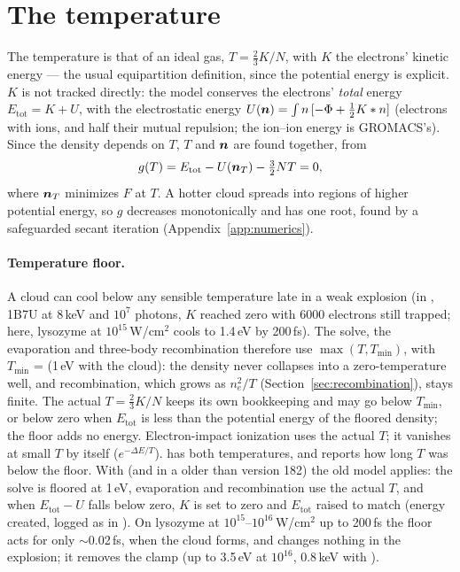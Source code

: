 \section{The temperature}
\label{sec:temperature}

The temperature is that of an ideal gas, $T = \frac23K/N$, with $K$ the electrons' kinetic energy --- the usual
equipartition definition, since the potential energy is explicit.
$K$ is not tracked directly: the model conserves the electrons' \emph{total} energy $E_{\mathrm{tot}} = K + U$, with
the electrostatic energy $U(\bm{n}) = \int n\,[-\Phi + \frac12K*n]$ (electrons with ions, and half their mutual
repulsion; the ion--ion energy is GROMACS's).
Since the density depends on $T$, $T$ and $\bm{n}$ are found together, from
\begin{equation}
  g(T) = E_{\mathrm{tot}} - U(\bm{n}_T) - \tfrac32NT = 0,
\end{equation}
where $\bm{n}_T$ minimizes $F$ at $T$.
A hotter cloud spreads into regions of higher potential energy, so $g$ decreases monotonically and has one root,
found by a safeguarded secant iteration (Appendix~\ref{app:numerics}).

\paragraph{Temperature floor.}
A cloud can cool below any sensible temperature late in a weak explosion (in , 1B7U at 8\,keV and
$10^7$ photons, $K$ reached zero with 6000 electrons still trapped; here, lysozyme at $10^{15}$\,W/cm$^2$ cools to
1.4\,eV by 200\,fs).
The solve, the evaporation and three-body recombination therefore use $\max(T, T_{\min})$, with $T_{\min}$ =
 (1\,eV with the cloud): the density never collapses into a zero-temperature well, and recombination, which grows as
$n_e^2/T$ (Section~\ref{sec:recombination}), stays finite.
The actual $T = \frac23K/N$ keeps its own bookkeeping and may go below $T_{\min}$, or below zero when
$E_{\mathrm{tot}}$ is less than the potential energy of the floored density; the floor adds no energy.
Electron-impact ionization uses the actual $T$; it vanishes at small $T$ by itself ($e^{-\Delta E/T}$).
 has both temperatures, and  reports how long $T$ was below the floor.
With  (and in a  older than version 182) the old model applies: the solve is floored
at 1\,eV, evaporation and recombination use the actual $T$, and when $E_{\mathrm{tot}} - U$ falls below zero, $K$ is
set to zero and $E_{\mathrm{tot}}$ raised to match (energy created, logged as  in ).
On lysozyme at $10^{15}$--$10^{16}$\,W/cm$^2$ up to 200\,fs the floor acts for only $\sim$0.02\,fs, when the cloud
forms, and changes nothing in the explosion; it removes the clamp (up to 3.5\,eV at $10^{16}$, 0.8\,keV with
).

